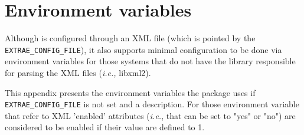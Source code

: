 \chapter{Environment variables}\label{cha:EnvVar}

Although \TRACE is configured through an XML file (which is pointed by the {\tt EXTRAE\_CONFIG\_FILE}), it also supports minimal configuration to be done via environment variables for those systems that do not have the library responsible for parsing the XML files ({\em i.e.,} libxml2).

This appendix presents the environment variables the \TRACE package uses if {\tt EXTRAE\_CONFIG\_FILE} is not set and a description. For those environment variable that refer to XML 'enabled' attributes ({\em i.e.}, that can be set to "yes" or "no") are considered to be enabled if their value are defined to 1.

